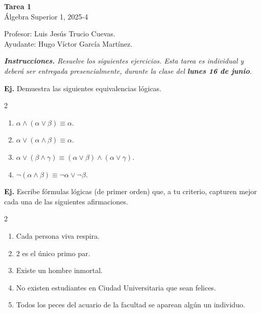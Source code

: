 \documentclass[letterpaper,DIV=14,headsepline,12pt]{scrartcl}
\newcounter{Ejer}
\newcommand{\pts}{}
\newenvironment{ejercicio}[1]{\noindent
    \ifthenelse{\equal{#1}{1}}{\renewcommand{\pts}{\textbf{(#1 pt)}}}{\renewcommand{\pts}{\textbf{(#1 pts)}}}\textbf{Ej. \theEjer} \pts\stepcounter{Ejer}}{\vspace{.3cm}}
\begin{document}
    \begin{center}
        {\fontsize{30}{60}\rmfamily \textbf{Tarea 1}} \\ \vspace{.2cm}
        Álgebra Superior 1, 2025-4
    \end{center}
    \begin{flushright}
        \footnotesize \hfill Profesor: Luis Jesús Trucio Cuevas.\\
        \hfill Ayudante: Hugo Víctor García Martínez.
    \end{flushright}

    \noindent\textit{\textbf{Instrucciones.} Resuelve los siguientes ejercicios. Esta tarea es individual y deberá ser entregada presencialmente, durante la clase del \textbf{lunes 16 de junio}.}\vspace{.4cm}

    \begin{ejercicio}{1}
        Demuestra las siguientes equivalencias lógicas.
        \begin{multicols}{2}
            \begin{enumerate}
                \item \(\alpha\land(\alpha\lor\beta)\equiv\alpha\).
                \item \(\alpha\lor(\alpha\land\beta)\equiv\alpha\).
                \item \(\alpha\lor(\beta\land\gamma)\equiv(\alpha\lor\beta)\land(\alpha\lor\gamma)\).
                \item \(\neg(\alpha\land\beta)\equiv\neg\alpha\lor\neg\beta\).
            \end{enumerate}
        \end{multicols}
    \end{ejercicio}

    \begin{ejercicio}{1}
        Escribe fórmulas lógicas (de primer orden) que, a tu criterio, capturen mejor cada una de las siguientes afirmaciones.
        \begin{paracol}{2}
            \begin{enumerate}
                \item Cada persona viva respira.
                \item $2$ es el único primo par.
                \item Existe un hombre inmortal.
            \end{enumerate}
            \switchcolumn
             \begin{enumerate}\setcounter{enumi}{3}
                \item No existen estudiantes en Ciudad Universitaria que sean felices.
                \item Todos los peces del acuario de la facultad se aparean algún un individuo.
            \end{enumerate}
        \end{paracol}
    \end{ejercicio}
\end{document}
